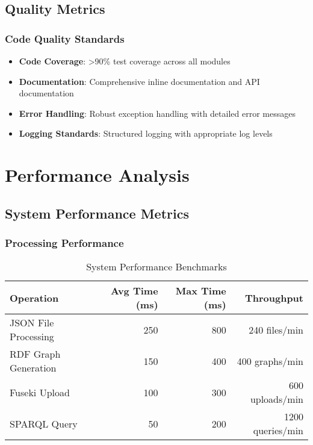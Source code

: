 \documentclass[12pt,a4paper]{article}
\begin{document}
\subsection{Quality Metrics}

\subsubsection{Code Quality Standards}

\begin{itemize}
    \item \textbf{Code Coverage}: >90\% test coverage across all modules
    \item \textbf{Documentation}: Comprehensive inline documentation and API documentation
    \item \textbf{Error Handling}: Robust exception handling with detailed error messages
    \item \textbf{Logging Standards}: Structured logging with appropriate log levels
\end{itemize}

\section{Performance Analysis}

\subsection{System Performance Metrics}

\subsubsection{Processing Performance}

\begin{table}[H]
\centering
\begin{tabular}{|l|r|r|r|}
\hline
\textbf{Operation} & \textbf{Avg Time (ms)} & \textbf{Max Time (ms)} & \textbf{Throughput} \\
\hline
JSON File Processing & 250 & 800 & 240 files/min \\
RDF Graph Generation & 150 & 400 & 400 graphs/min \\
Fuseki Upload & 100 & 300 & 600 uploads/min \\
SPARQL Query & 50 & 200 & 1200 queries/min \\
\hline
\end{tabular}
\caption{System Performance Benchmarks}
\end{table}
\end{document}
